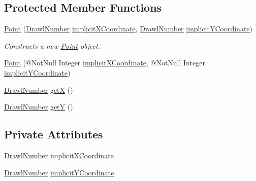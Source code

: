 \subsection*{Protected Member Functions}
\begin{DoxyCompactItemize}
\item 
\hyperlink{classcom_1_1aarrelaakso_1_1drawl_1_1_point_a934b3150ce40f5da49f10ed45a957e32}{Point} (\hyperlink{classcom_1_1aarrelaakso_1_1drawl_1_1_drawl_number}{Drawl\+Number} \hyperlink{classcom_1_1aarrelaakso_1_1drawl_1_1_point_ac6643d28a97dd4db5803239cf6652eda}{implicit\+X\+Coordinate}, \hyperlink{classcom_1_1aarrelaakso_1_1drawl_1_1_drawl_number}{Drawl\+Number} \hyperlink{classcom_1_1aarrelaakso_1_1drawl_1_1_point_a524e26eff45b9030d754788ed86f7ac2}{implicit\+Y\+Coordinate})
\begin{DoxyCompactList}\small\item\em Constructs a new \hyperlink{classcom_1_1aarrelaakso_1_1drawl_1_1_point}{Point} object. \end{DoxyCompactList}\item 
\hyperlink{classcom_1_1aarrelaakso_1_1drawl_1_1_point_a3160ea0fd6d9632ccc4fcefe15680e8d}{Point} (@Not\+Null Integer \hyperlink{classcom_1_1aarrelaakso_1_1drawl_1_1_point_ac6643d28a97dd4db5803239cf6652eda}{implicit\+X\+Coordinate}, @Not\+Null Integer \hyperlink{classcom_1_1aarrelaakso_1_1drawl_1_1_point_a524e26eff45b9030d754788ed86f7ac2}{implicit\+Y\+Coordinate})
\item 
\hyperlink{classcom_1_1aarrelaakso_1_1drawl_1_1_drawl_number}{Drawl\+Number} \hyperlink{classcom_1_1aarrelaakso_1_1drawl_1_1_point_a69062d6a80ab951e2687e31d2b3f99ee}{getX} ()
\item 
\hyperlink{classcom_1_1aarrelaakso_1_1drawl_1_1_drawl_number}{Drawl\+Number} \hyperlink{classcom_1_1aarrelaakso_1_1drawl_1_1_point_a9b4a6a3de7c80227d5d318dc9afb4edd}{getY} ()
\end{DoxyCompactItemize}
\subsection*{Private Attributes}
\begin{DoxyCompactItemize}
\item 
\hyperlink{classcom_1_1aarrelaakso_1_1drawl_1_1_drawl_number}{Drawl\+Number} \hyperlink{classcom_1_1aarrelaakso_1_1drawl_1_1_point_ac6643d28a97dd4db5803239cf6652eda}{implicit\+X\+Coordinate}
\item 
\hyperlink{classcom_1_1aarrelaakso_1_1drawl_1_1_drawl_number}{Drawl\+Number} \hyperlink{classcom_1_1aarrelaakso_1_1drawl_1_1_point_a524e26eff45b9030d754788ed86f7ac2}{implicit\+Y\+Coordinate}
\end{DoxyCompactItemize}


